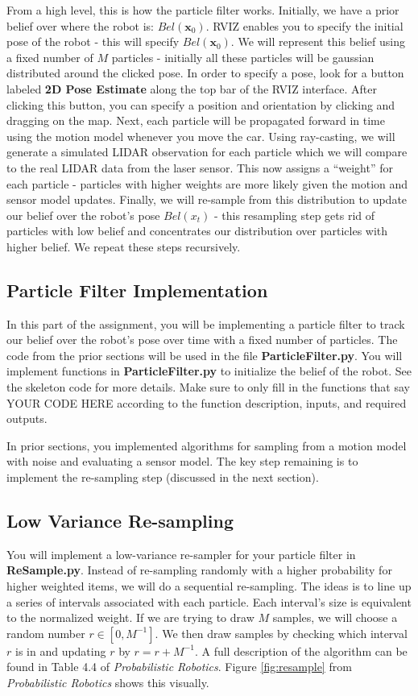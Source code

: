 \documentclass[final]{article}
\begin{document}
From a high level, this is how the particle filter works. Initially, we have a prior belief over where the robot is: $Bel(\mathbf{x}_0)$. RVIZ enables you to specify the initial pose of the robot - this will specify $Bel(\mathbf{x}_0)$. We will represent this belief using a fixed number of $M$ particles - initially all these particles will be gaussian distributed around the clicked pose. In order to specify a pose, look for a button labeled \textbf{2D Pose Estimate} along the top bar of the RVIZ interface. After clicking this button, you  can specify a position and orientation by clicking and dragging on the map. Next, each particle will be propagated forward in time using the motion model whenever you move the car. Using ray-casting, we will generate a simulated LIDAR observation for each particle which we will compare to the real LIDAR data from the laser sensor. This now assigns a ``weight'' for each particle - particles with higher weights are more likely given the motion and sensor model updates. Finally, we will re-sample from this distribution to update our belief over the robot's pose $Bel(x_t)$ - this resampling step gets rid of particles with low belief and concentrates our distribution over particles with higher belief. We repeat these steps recursively.

\subsection{Particle Filter Implementation}
In this part of the assignment, you will be implementing a particle filter to track our belief over the robot's pose over time with a fixed number of particles. The code from the prior sections will be used in the file \textbf{ParticleFilter.py}. You will implement functions in \textbf{ParticleFilter.py} to initialize the belief of the robot. See the skeleton code for more details. Make sure to only fill in the functions that say YOUR CODE HERE according to the function description, inputs, and required outputs.

In prior sections, you implemented algorithms for sampling from a motion model with noise and evaluating a sensor model. The key step remaining is to implement the re-sampling step (discussed in the next section).

\subsection{Low Variance Re-sampling}
You will implement a low-variance re-sampler for your particle filter in \textbf{ReSample.py}. Instead of re-sampling randomly with a higher probability for higher weighted items, we will do a sequential re-sampling. The ideas is to line up a series of intervals associated with each particle. Each interval's size is equivalent to the normalized weight. If we are trying to draw \(M\) samples, we will choose a random number \(r\in [0,M^{-1}]\). We then draw samples by checking which interval \(r\) is in and updating \(r\) by \(r = r + M^{-1}\). A full description of the algorithm can be found in Table 4.4 of \textit{Probabilistic Robotics}. Figure \ref{fig:resample} from \textit{Probabilistic Robotics} shows this visually.
\end{document}
